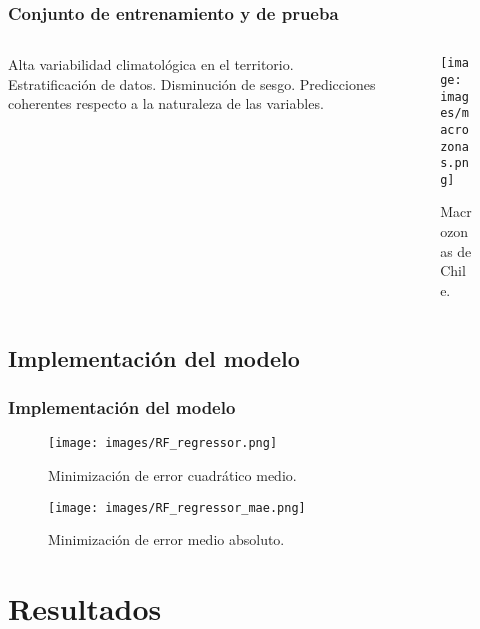 \documentclass{beamer}
\begin{document}
  \begin{frame}
    \frametitle{Conjunto de entrenamiento y de prueba}

    \begin{columns}

      \begin{column}{0.5\textwidth}
        \begin{outline}
          \1 Alta variabilidad climatológica en el territorio.
          \1 Estratificación de datos.
            \2 Disminución de sesgo.
            \2 Predicciones coherentes respecto a la naturaleza de las variables.
        \end{outline}
      \end{column}

      \begin{column}{0.5\textwidth}
        \begin{figure}
          \begin{center}
            \texttt{[image: images/macrozonas.png]}
          \end{center}
          \caption{Macrozonas de Chile.}
        \end{figure}
      \end{column}

    \end{columns}
  \end{frame}

  \subsection*{Implementación del modelo}
  
  \begin{frame}
    \frametitle{Implementación del modelo}

    \centering
    \begin{figure}
      \texttt{[image: images/RF\_regressor.png]}
      \caption{Minimización de error cuadrático medio.}

     \texttt{[image: images/RF\_regressor\_mae.png]}
     \caption{Minimización de error medio absoluto.}

    \end{figure}
  \end{frame}

  \section{Resultados}
\end{document}
